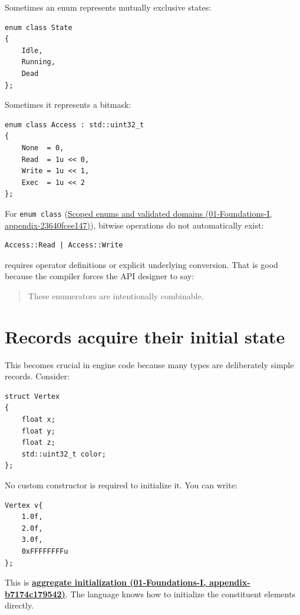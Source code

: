 Sometimes an enum represents mutually exclusive states:

\begin{verbatim}
enum class State
{
    Idle,
    Running,
    Dead
};
\end{verbatim}

Sometimes it represents a bitmask:

\begin{verbatim}
enum class Access : std::uint32_t
{
    None  = 0,
    Read  = 1u << 0,
    Write = 1u << 1,
    Exec  = 1u << 2
};
\end{verbatim}

For \texttt{enum\ class} (\href{../01-Foundations-I/main.pdf\#nameddest=appendix-23640fcee147}{Scoped enums and validated domains (01-Foundations-I, appendix-23640fcee147)}), bitwise operations do not automatically exist:

\begin{verbatim}
Access::Read | Access::Write
\end{verbatim}

requires operator definitions or explicit underlying conversion. That is good because the compiler forces the API designer to say:

\begin{quote}
These enumerators are intentionally combinable.
\end{quote}

\section{Records acquire their initial state}\label{05-engine-i-ch003-records-acquire-their-initial-state}

This becomes crucial in engine code because many types are deliberately simple records. Consider:

\begin{verbatim}
struct Vertex
{
    float x;
    float y;
    float z;
    std::uint32_t color;
};
\end{verbatim}

No custom constructor is required to initialize it. You can write:

\begin{verbatim}
Vertex v{
    1.0f,
    2.0f,
    3.0f,
    0xFFFFFFFFu
};
\end{verbatim}

This is \textbf{\href{../01-Foundations-I/main.pdf\#nameddest=appendix-b7174c179542}{aggregate initialization (01-Foundations-I, appendix-b7174c179542)}}. The language knows how to initialize the constituent elements directly.

